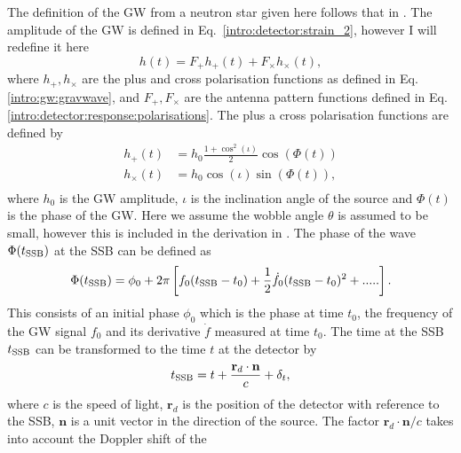 The definition of the \gls{GW} from a neutron star given here follows that in
\citep{riles2017RecentSearches,schutz1998DataAnalysis,dupuis2005BayesianEstimation}.
The amplitude of the \gls{GW} is defined in Eq.~\ref{intro:detector:strain_2}, however I will redefine it here
%
\begin{equation}
\label{searchcw:model:amplitude}
h(t) = F_{+}h_{+}(t) + F_{\times}h_{\times}(t),
\end{equation}
%
where $h_{+},h_{\times}$ are the plus and cross polarisation functions as defined in
Eq.\ref{intro:gw:gravwave}, and $F_{+},F_{\times}$ are the antenna pattern
functions  defined in Eq.\ref{intro:detector:response:polarisations}. The plus a cross polarisation functions are defined by
%
\begin{equation}
\label{intro:cw:amplitudes}
    \begin{split}
        h_{+}(t) &=  h_0 \frac{1 + \cos^2{(\iota)}}{2}\cos{\left(\Phi(t)\right)} \\
        h_{\times}(t) &= h_0  \cos{(\iota)} \sin{\left( \Phi(t)\right) }, \\
    \end{split}
\end{equation}
%
where $h_0$ is the \gls{GW} amplitude, $\iota$ is the inclination angle of the source and $\Phi(t)$ is the phase of the \gls{GW}. 
Here we assume the wobble angle $\theta$ is assumed to be small,
however this is included in the derivation in \citep{schutz1998DataAnalysis}.
The phase of the wave $\Phi(t_{{\rm SSB}})$ at the \gls{SSB} can be defined as
%
\begin{equation}
\label{searchcw:model:phase}
    \Phi(t_{{\rm SSB}}) = \phi_0 + 2\pi\left[ f_0(t_{{\rm SSB}} - t_0) + \frac{1}{2} \dot{f_0} (t_{{\rm SSB}} - t_0)^2 + .....\right] .
\end{equation}
%
This consists of an initial phase $\phi_0$ which is the phase at time $t_0$,
the frequency of the \gls{GW} signal $f_0$ and its derivative ${\dot{f}}$ measured at
time $t_0$. The time at the \gls{SSB} $t_{{\rm SSB}}$ can be
transformed to the time $t$ at the detector by
%
\begin{equation}
	\label{searchcw:model:ssbtime}
t_{{\rm SSB}} = t + \frac{\mathbf{r}_d \cdot \mathbf{n}}{c} + \delta_t,
\end{equation}
%
where $c$ is the speed of light, $\mathbf{r}_d$ is the position of the detector with reference to the
\gls{SSB}, $\mathbf{n}$ is a unit vector in the direction of the source. The factor $\mathbf{r}_d \cdot \mathbf{n}/c$ takes into account the Doppler shift of the
